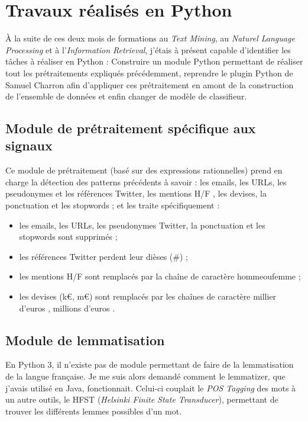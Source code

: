 \section{Travaux réalisés en Python}
\label{sec:travaux_python}
    À la suite de ces deux mois de formations au \textit{Text Mining}, au \textit{Naturel Language Processing} et à l'\textit{Information Retrieval}, j'étais à présent capable d'identifier les tâches à réaliser en Python : Construire un module Python permettant de réaliser tout les prétraitements expliqués précédemment, reprendre le plugin Python de Samuel Charron afin d'appliquer ces prétraitement en amont de la construction de l'ensemble de données et enfin changer de modèle de classifieur.

    \subsection{Module de prétraitement spécifique aux signaux}
        Ce module de prétraitement (basé sur des expressions rationnelles) prend en charge la détection des patterns précédents à savoir : les emails, les URLs, les pseudonymes et les références Twitter, les mentions \og H/F \fg, les devises, la ponctuation et les stopwords ; et les traite spécifiquement :
        \begin{itemize}
            \item les emails, les URLs, les pseudonymes Twitter, la ponctuation et les stopwords sont supprimés ;
            \item les références Twitter perdent leur dièses (\#) ;
            \item les mentions \og H/F \fg  sont remplacés par la chaîne de caractère \og hommeoufemme \fg ;
            \item les devises (k€, m€) sont remplacés par les chaînes de caractère \og millier d'euros \fg, \og millions d'euros \fg.
        \end{itemize}

    \subsection{Module de lemmatisation}
        En Python 3, il n'existe pas de module permettant de faire de la lemmatisation de la langue française. Je me suis alors demandé comment le lemmatizer, que j'avais utilisé en Java, fonctionnait. Celui-ci couplait le \textit{POS Tagging} des mots à un autre outils, le HFST (\textit{Helsinki Finite State Transducer}), permettant de trouver les différents lemmes possibles d'un mot.\\

